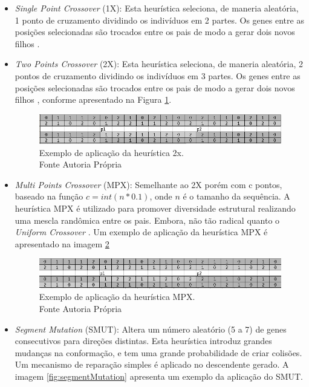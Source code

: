  \begin{itemize}
 	
 		\item \textit{Single Point Crossover} (1X): Esta heurística seleciona, de maneria aleatória, 1 ponto de cruzamento dividindo os indivíduos em 2 partes. Os genes entre as posições selecionadas são trocados entre os pais de modo a gerar dois novos filhos \cite{benitez2015algoritmo}.
 	
 	\item \textit{Two Points Crossover} (2X): Esta heurística seleciona, de maneria aleatória, 2 pontos de cruzamento dividindo os indivíduos em 3 partes. Os genes entre as posições selecionadas são trocados entre os pais de modo a gerar dois novos filhos \cite{benitez2015algoritmo}, conforme apresentado na Figura \ref{fig:twopointscrossover}.
 	
 	
 	\begin{figure}[!htb]
 		\centering
 		\includegraphics[scale=0.8]{Imagens/TwoPointsCrossover.png}
 		\caption{Exemplo de aplicação da heurística 2x. \\Fonte Autoria Própria}
 		\label{fig:twopointscrossover}
 	\end{figure}
 	
 	
 	
 	
 	\item \textit{Multi Points Crossover} (MPX): Semelhante ao 2X porém com c pontos, baseado na função $c = int(n * 0.1)$, onde $n$ é o tamanho da sequência. A heurística MPX é utilizado para promover diversidade estrutural realizando uma mescla randômica entre os pais. Embora, não tão radical quanto o \textit{Uniform  Crossover} \cite{sabar2015automatic}. Um exemplo de aplicação da heurística MPX é apresentado na imagem \ref{fig:multipointscrossover}
 	
 	
 	\begin{figure}[!htb]
 		\centering
 		\includegraphics[scale=0.8]{Imagens/MultiPointsCrossover.png}
 		\caption{Exemplo de aplicação da heurística MPX. \\Fonte Autoria Própria}
 		\label{fig:multipointscrossover}
 	\end{figure}
 	\item \textit{Segment Mutation} (SMUT): Altera um número aleatório (5 a 7) de genes consecutivos para direções distintas. Esta heurística introduz grandes mudanças na conformação, e tem uma grande probabilidade de criar colisões. Um mecanismo de reparação simples é aplicado no descendente gerado. A imagem \ref{fig:segmentMutation} apresenta um exemplo da aplicação do SMUT.
 	

\end{itemize}
